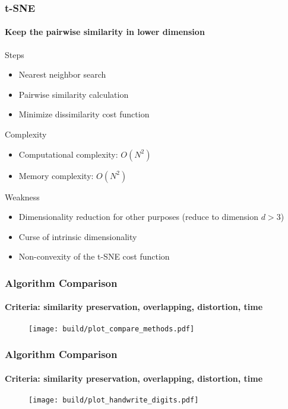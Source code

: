 \documentclass{beamer}
\begin{document}
% 
% 
% 
% 
% 
%
\begin{frame}
  \frametitle{t-SNE}
  \framesubtitle{Keep the pairwise similarity in lower dimension}

  
  {Steps}
  \begin{itemize}
    \item Nearest neighbor search
    \item Pairwise similarity calculation
    \item Minimize dissimilarity cost function
  \end{itemize}

  {Complexity}
    \begin{itemize}
      \item Computational complexity: $O(N^2)$
      \item Memory complexity: $O(N^2)$
    \end{itemize}

    {Weakness}
    \begin{itemize}
      \item Dimensionality reduction for other purposes (reduce to dimension $d > 3$)
      \item Curse of intrinsic dimensionality 
      \item Non-convexity of the t-SNE cost function
    \end{itemize}    
    
\end{frame}

% 
% 
% 
% 
% 
%
\begin{frame}
\frametitle{Algorithm Comparison}
\framesubtitle{Criteria: similarity preservation, overlapping, distortion, time}
\begin{figure}
  \centering
  \texttt{[image: build/plot\_compare\_methods.pdf]}
\end{figure}
\end{frame}

% 
% 
% 
% 
% 
%
\begin{frame}
  \frametitle{Algorithm Comparison}
  \framesubtitle{Criteria: similarity preservation, overlapping, distortion, time}
  \begin{figure}
    \centering
    \texttt{[image: build/plot\_handwrite\_digits.pdf]}
  \end{figure}
  \end{frame}
\end{document}
